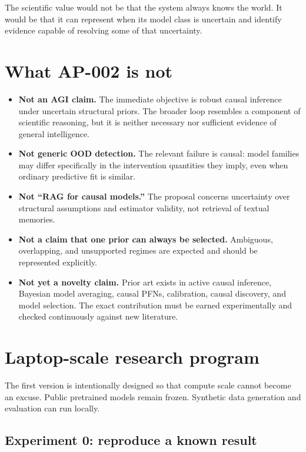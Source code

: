 \documentclass[11pt]{article}
\begin{document}
The scientific value would not be that the system always knows the world. It would be that it can represent when its model class is uncertain and identify evidence capable of resolving some of that uncertainty.

\section{What AP-002 is not}

\begin{itemize}
  \item \textbf{Not an AGI claim.} The immediate objective is robust causal inference under uncertain structural priors. The broader loop resembles a component of scientific reasoning, but it is neither necessary nor sufficient evidence of general intelligence.
  \item \textbf{Not generic OOD detection.} The relevant failure is causal: model families may differ specifically in the intervention quantities they imply, even when ordinary predictive fit is similar.
  \item \textbf{Not ``RAG for causal models.''} The proposal concerns uncertainty over structural assumptions and estimator validity, not retrieval of textual memories.
  \item \textbf{Not a claim that one prior can always be selected.} Ambiguous, overlapping, and unsupported regimes are expected and should be represented explicitly.
  \item \textbf{Not yet a novelty claim.} Prior art exists in active causal inference, Bayesian model averaging, causal PFNs, calibration, causal discovery, and model selection. The exact contribution must be earned experimentally and checked continuously against new literature.
\end{itemize}

\section{Laptop-scale research program}

The first version is intentionally designed so that compute scale cannot become an excuse. Public pretrained models remain frozen. Synthetic data generation and evaluation can run locally.

\subsection*{Experiment 0: reproduce a known result}
\end{document}
